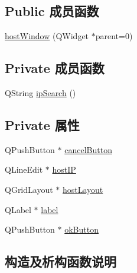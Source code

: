 \subsection*{Public 成员函数}
\begin{DoxyCompactItemize}
\item 
\hyperlink{classhost_window_acfe961f36b766fc3a1140b6e633d3925_acfe961f36b766fc3a1140b6e633d3925}{host\+Window} (Q\+Widget $\ast$parent=0)
\end{DoxyCompactItemize}
\subsection*{Private 成员函数}
\begin{DoxyCompactItemize}
\item 
Q\+String \hyperlink{classhost_window_aabfa278b993368b59aa65311b256926a_aabfa278b993368b59aa65311b256926a}{ip\+Search} ()
\end{DoxyCompactItemize}
\subsection*{Private 属性}
\begin{DoxyCompactItemize}
\item 
Q\+Push\+Button $\ast$ \hyperlink{classhost_window_a8fe146290eaba177d1f14d207725ea76_a8fe146290eaba177d1f14d207725ea76}{cancel\+Button}
\item 
Q\+Line\+Edit $\ast$ \hyperlink{classhost_window_aa5e9ae69f635b0a98c5b588b67f66641_aa5e9ae69f635b0a98c5b588b67f66641}{host\+IP}
\item 
Q\+Grid\+Layout $\ast$ \hyperlink{classhost_window_a030a018c2a4e6bc7af999828a0934ef8_a030a018c2a4e6bc7af999828a0934ef8}{host\+Layout}
\item 
Q\+Label $\ast$ \hyperlink{classhost_window_a59f675f1d69728ab3d87c814bf04eb83_a59f675f1d69728ab3d87c814bf04eb83}{label}
\item 
Q\+Push\+Button $\ast$ \hyperlink{classhost_window_aae2ab50869ebb07d4085fbc88d1fb0de_aae2ab50869ebb07d4085fbc88d1fb0de}{ok\+Button}
\end{DoxyCompactItemize}


\subsection{构造及析构函数说明}
